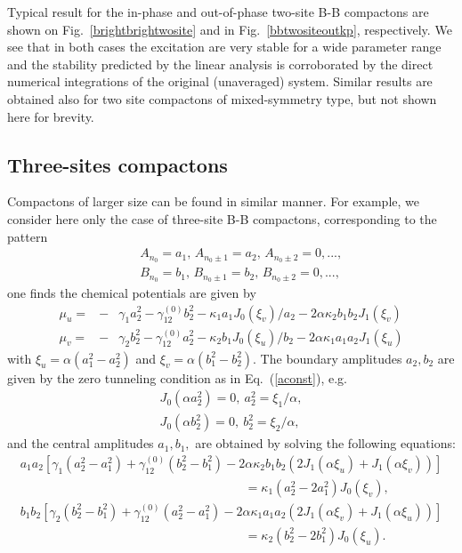 \documentclass[12pt]{iopart}
\begin{document}
Typical result for the  in-phase and out-of-phase two-site B-B compactons are shown on Fig.~\ref{brightbrightwosite} and in  Fig.~\ref{bbtwositeoutkp}, respectively. We see that in both cases the excitation are very stable for a wide parameter range and the stability predicted by the linear analysis is corroborated by the direct numerical integrations of the original (unaveraged) system.   Similar results are obtained also for two site compactons of  mixed-symmetry type, but not shown here for brevity.



\subsection{Three-sites compactons}
Compactons of larger size can  be found in similar manner. For example, we consider here only the case of three-site B-B compactons, corresponding to the pattern
\begin{eqnarray}
&&
A_{n_{0}}=a_1,\,A_{n_{0}\pm1}=a_2,\,A_{n_{0}\pm2}=0, ..., \nonumber  \\
&&
B_{n_{0}}=b_{1},\,B_{n_{0}\pm1}=b_{2},\,B_{n_{0}\pm2}=0, ...,
\label{3-site-ansatz}
\end{eqnarray}
one finds the chemical potentials are given by
\begin{eqnarray*}
\mu_{u}= & -&\gamma_{1}a_{2}^{2}-\gamma_{12}^{(0)}b_{2}^{2}-\kappa_{1}a_{1}J_{0}\left(\xi_{v}\right)/a_{2} - 2\alpha\kappa_{2}b_{1}b_{2}J_{1}\left(\xi_{v}\right)\\
\mu_{v}= & -&\gamma_{2}b_{2}^{2}-\gamma_{12}^{(0)}a_{2}^{2}-\kappa_{2}b_{1}J_{0}\left(\xi_{u}\right)/b_{2} - 2\alpha\kappa_{1}a_{1}a_{2}J_{1}\left(\xi_{u}\right)
\end{eqnarray*}
with $\xi_{u}=\alpha\left(a_{1}^{2}-a_{2}^{2}\right)$ and $\xi_{v}=\alpha\left(b_{1}^{2}-b_{2}^{2}\right)$. The boundary amplitudes $a_2, b_2$ are given by the zero tunneling condition as in Eq.~(\ref{aconst}), e.g.
\begin{eqnarray}
J_{0}(\alpha a_2^{2})=0,\ a_2^{2}=\xi_{1}/\alpha,\nonumber \\
J_{0}(\alpha b_2^{2})=0,\ b_2^{2}=\xi_{2}/\alpha,
\label{3abconst}
\end{eqnarray}
and the central amplitudes $a_1, b_1,$ are obtained by solving the following equations:
\begin{eqnarray}
a_{1}a_{2}\left[ \gamma_{1}\left(a_{2}^{2}-a_{1}^{2}\right)+
\gamma_{12}^{(0)}\left(b_{2}^{2}-b_{1}^{2}\right)-2\alpha\kappa_{2}b_{1}b_{2}\left(2J_{1}
\left(\alpha\xi_{u}\right)+J_{1}\left(\alpha\xi_{v}\right)\right)\right]
\nonumber \\
\qquad\qquad\qquad\qquad\qquad\qquad\qquad\qquad\qquad
=\kappa_{1}\left(a_{2}^{2}-2a_{1}^{2}\right)J_{0}\left(\xi_{v}\right),\\
b_{1}b_{2}\left[ \gamma_{2}\left(b_{2}^{2}-b_{1}^{2}\right)+
\gamma_{12}^{(0)}\left(a_{2}^{2}-a_{1}^{2}\right)-2\alpha\kappa_{1}a_{1}a_{2}\left(2J_{1}
\left(\alpha\xi_{v}\right)+J_{1}\left(\alpha\xi_{u}\right)\right)\right] \nonumber \\
\qquad\qquad\qquad\qquad\qquad\qquad\qquad\qquad\qquad
=\kappa_{2}\left(b_{2}^{2}-2b_{1}^{2}\right)J_{0}\left(\xi_{u}\right).
\label{3site-eqs}
\end{eqnarray}
\end{document}

